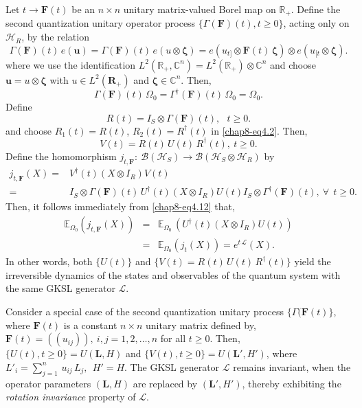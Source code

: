Let $t\rightarrow \mathbf{F}(t)$ be an $n\times n$  unitary matrix-valued Borel map on $\mathbb{R}_+$. Define the second quantization unitary operator process $\{\Gamma(\mathbf{F})(t), t\geq 0\}$, acting only on $\mathcal{H}_R$, by the relation 
\begin{equation} 
\Gamma(\mathbf{F})(t)\, e(\mathbf{u})=\Gamma(\mathbf{F})(t)\,e(u\otimes \pmb{\zeta})= 
e\left(u_{t]}\otimes \mathbf{F}(t)\, \pmb{\zeta}\right)\otimes e(u_{[t}\otimes \pmb{\zeta}).  \label{chap8-eq4.11}
\end{equation}
where we  use the identification $L^2(\mathbb{R}_+,\mathbb{C}^n)=L^2(\mathbb{R}_+)\otimes\mathbb{C}^n$ and choose 
$\mathbf{u}=u\otimes \pmb{\zeta}$ with $u \in  L^2(\mathbf{R}_+)$ and  $\pmb{\zeta}\in\mathbb{C}^n$. Then, 
\begin{equation} 
\Gamma(\mathbf{F})(t)\, \Omega_0= \Gamma^\dag(\mathbf{F})(t)\, \Omega_0=\Omega_0.   \label{chap8-eq4.12}
\end{equation}
Define 
\begin{equation}
R(t)=I_S\otimes \Gamma(\mathbf{F})(t),\ \ \  t\geq 0. \label{chap8-eq4.13}
\end{equation}
and choose $R_1(t)=R(t)$, $R_2(t)=R^\dag(t)$ in \eqref{chap8-eq4.2}. Then, 
$$
V(t)=R(t)\,U(t)\, R^\dag(t),\  t\geq 0.
$$  
Define the homomorphism $j_{t,\mathbf{F}}:  \ \mathcal{B}(\mathcal{H}_S)\longrightarrow \mathcal{B}(\mathcal{H}_S\otimes\mathcal{H}_R)$ by 
\begin{align}
j_{t,\mathbf{F}} (X) =& V^{\dagger}(t) (X \otimes I_R)  V(t) \nonumber \\
=& I_S\otimes \Gamma(\mathbf{F})(t)\,   U^{\dagger}(t) (X \otimes I_R)  U(t) I_S\otimes \Gamma^\dag(\mathbf{F})(t),\ \forall \ \  t\geq 0. \label{chap8-eq4.14}
\end{align}  
Then, it follows immediately from  \eqref{chap8-eq4.12} that, 
\begin{eqnarray}
\mathbb{E}_{\Omega_0} \left(j_{t,\mathbf{F}}(X)\right)&=&\mathbb{E}_{\Omega_0}\, \left(U^{\dagger}(t) (X \otimes I_R)  U(t)\right)\nonumber \\ 
&=& \mathbb{E}_{\Omega_0} \left(j_t(X)\right)=e^{t\,\mathcal{L}}(X).\label{chap8-eq4.15}
\end{eqnarray}
In other words, both   $\{U(t)\}$ and $\{V(t)=R(t)\,U(t)\, R^\dag(t)\}$ yield the irreversible dynamics of the states and observables of the quantum system with the same GKSL generator $\mathcal{L}$.      

\begin{remark}
Consider a special case of the second quantization unitary process $\{\Gamma(\mathbf{F}(t)\}$, where $\mathbf{F}(t)$ is a constant $n\times n$ unitary matrix defined by, $\mathbf{F}(t)=((u_{ij})),\ i,j=1,2,\ldots , n$ for all $t\geq 0$. Then, $\{U(t), t\geq 0\}=U(\mathbf{L},H)$ and $\{V(t), t\geq 0\}=U(\mathbf{L}',H')$, where $L'_i=\sum_{j=1}^n\, u_{ij}\, L_j, \ \ H'=H$.  The GKSL generator $\mathcal{L}$ remains invariant, when  the operator parameters $(\mathbf{L}, H)$ are replaced by $(\mathbf{L'}, H')$, thereby exhibiting the  {\em rotation invariance} property of $\mathcal{L}$. 
\end{remark}


